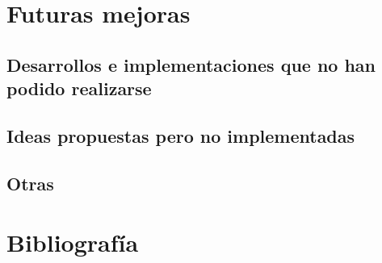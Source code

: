 \chapter{Futuras mejoras}

\section{Desarrollos e implementaciones que no han podido realizarse}

\section{Ideas propuestas pero no implementadas}

\section{Otras}


\chapter*{Bibliografía}


\appendix
